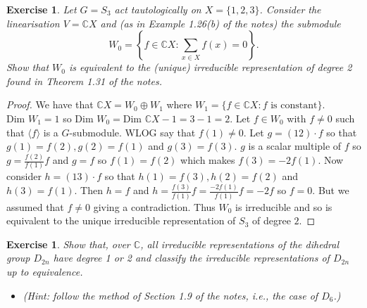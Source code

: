 \documentclass{article}
\newtheorem{exercise}[theorem]{Exercise}
\begin{document}
\begin{exercise}
     Let \( G = S_3 \) act tautologically on \( X = \{1, 2, 3\} \). Consider the linearisation \( V = \mathbb{C}X \) and (as in Example 1.26(b) of the notes) the submodule
    \[
    W_0 = \left\{ f \in \mathbb{C}X : \sum_{x \in X} f(x) = 0 \right\}.
    \]
    Show that \( W_0 \) is equivalent to the (unique) irreducible representation of degree 2 found in Theorem 1.31 of the notes.
\end{exercise}
\begin{proof}
We have that $\mathbb{C}X=W_0\oplus W_1$ where $W_1=\{f\in\mathbb{C}X:f\text{ is constant}\}$. $\text{Dim }W_1=1$ so $\text{Dim }W_0=\text{Dim }\mathbb{C}X-1=3-1=2$. Let $f\in W_0$ with $f\neq 0$ such that $\langle f\rangle$ is a $G$-submodule. WLOG say that $f(1)\neq 0$. Let $g=(12)\cdot f$ so that $g(1)=f(2),g(2)=f(1)$ and $g(3)=f(3)$. $g$ is a scalar multiple of $f$ so $g=\frac{f(2)}{f(1)}f$ and $g=f$ so $f(1)=f(2)$ which makes $f(3)=-2f(1)$. Now consider $h=(13)\cdot f$ so that $h(1)=f(3),h(2)=f(2)$ and $h(3)=f(1)$. Then $h=f$ and $h=\frac{f(3)}{f(1)}f=\frac{-2f(1)}{f(1)}f=-2f$ so $f=0$. But we assumed that $f\neq 0$ giving a contradiction. Thus $W_0$ is irreducible and so is equivalent to the unique irreducible representation of $S_3$ of degree $2$.
\end{proof}


\begin{exercise}
     Show that, over \( \mathbb{C} \), all irreducible representations of the dihedral group \( D_{2n} \) have degree 1 or 2 and classify the irreducible representations of \( D_{2n} \) up to equivalence.
    \begin{itemize}
        \item (Hint: follow the method of Section 1.9 of the notes, i.e., the case of \( D_6 \).)
    \end{itemize}
\end{exercise}
\end{document}
